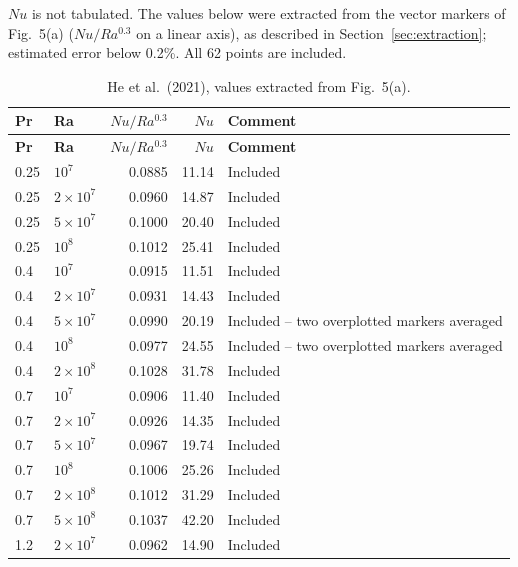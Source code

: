\documentclass[11pt]{article}
\begin{document}
$Nu$ is not tabulated. The values below were extracted from the vector
markers of Fig.~5(a) ($Nu/Ra^{0.3}$ on a linear axis), as described in
Section~\ref{sec:extraction}; estimated error below 0.2\%. All 62 points are
included.

\begin{longtable}{l l r r l}
\caption{He et al.\ (2021), values extracted from Fig.~5(a).}\label{tab:he2021}\\
\toprule
\textbf{Pr} & \textbf{Ra} & $Nu/Ra^{0.3}$ & $Nu$ & \textbf{Comment} \\
\midrule
\endfirsthead
\toprule
\textbf{Pr} & \textbf{Ra} & $Nu/Ra^{0.3}$ & $Nu$ & \textbf{Comment} \\
\midrule
\endhead
\bottomrule
\endfoot
\rowcolor{included} 0.25 & $10^{7}$ & 0.0885 & 11.14 & Included \\
\rowcolor{included} 0.25 & $2\times10^{7}$ & 0.0960 & 14.87 & Included \\
\rowcolor{included} 0.25 & $5\times10^{7}$ & 0.1000 & 20.40 & Included \\
\rowcolor{included} 0.25 & $10^{8}$ & 0.1012 & 25.41 & Included \\
\rowcolor{included} 0.4 & $10^{7}$ & 0.0915 & 11.51 & Included \\
\rowcolor{included} 0.4 & $2\times10^{7}$ & 0.0931 & 14.43 & Included \\
\rowcolor{included} 0.4 & $5\times10^{7}$ & 0.0990 & 20.19 & Included -- two overplotted markers averaged \\
\rowcolor{included} 0.4 & $10^{8}$ & 0.0977 & 24.55 & Included -- two overplotted markers averaged \\
\rowcolor{included} 0.4 & $2\times10^{8}$ & 0.1028 & 31.78 & Included \\
\rowcolor{included} 0.7 & $10^{7}$ & 0.0906 & 11.40 & Included \\
\rowcolor{included} 0.7 & $2\times10^{7}$ & 0.0926 & 14.35 & Included \\
\rowcolor{included} 0.7 & $5\times10^{7}$ & 0.0967 & 19.74 & Included \\
\rowcolor{included} 0.7 & $10^{8}$ & 0.1006 & 25.26 & Included \\
\rowcolor{included} 0.7 & $2\times10^{8}$ & 0.1012 & 31.29 & Included \\
\rowcolor{included} 0.7 & $5\times10^{8}$ & 0.1037 & 42.20 & Included \\
\rowcolor{included} 1.2 & $2\times10^{7}$ & 0.0962 & 14.90 & Included \\

\end{longtable}
\end{document}
